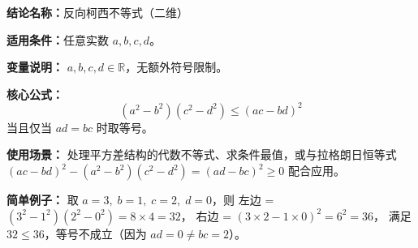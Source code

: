 \textbf{结论名称：}反向柯西不等式（二维）

\textbf{适用条件：}任意实数 \(a,b,c,d\)。

\textbf{变量说明：} \(a,b,c,d \in \mathbb{R}\)，无额外符号限制。

\textbf{核心公式：}
\[
\boxed{(a^{2} - b^{2})(c^{2} - d^{2}) \leqslant (ac - bd)^{2}}
\]
当且仅当 \(ad = bc\) 时取等号。

\textbf{使用场景：} 处理平方差结构的代数不等式、求条件最值，或与拉格朗日恒等式 \((ac-bd)^{2}-(a^{2}-b^{2})(c^{2}-d^{2})=(ad-bc)^{2}\geqslant0\) 配合应用。

\textbf{简单例子：} 取 \(a=3,\; b=1,\; c=2,\; d=0\)，则
左边 = \((3^{2}-1^{2})(2^{2}-0^{2})=8\times4 = 32\)，
右边 = \((3\times2 - 1\times0)^{2}=6^{2}=36\)，
满足 \(32 \leqslant 36\)，等号不成立（因为 \(ad=0 \neq bc=2\)）。